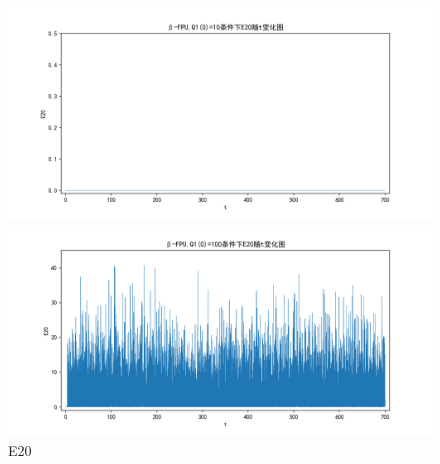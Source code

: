 \documentclass[10pt, a4paper]{article}
\begin{document}
    \begin{figure}[H]
        \begin{minipage}[t]{0.49\textwidth}
            \centering
            \includegraphics[width=\textwidth]{./q6_pics/cmp/E20.png}
        \end{minipage}
        \begin{minipage}[t]{0.49\textwidth}
            \centering
            \includegraphics[width=\textwidth]{./q6_pics/exp/E20.png}
        \end{minipage}
        \caption{E20}\label{fig:E20 in q6}
    \end{figure}
\end{document}
